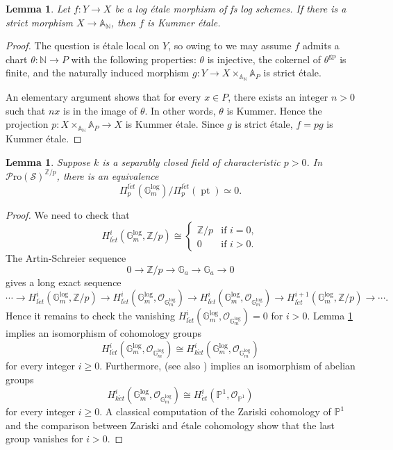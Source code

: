 \documentclass[11pt, a4paper]{amsart}
\newtheorem{lem}[thm]{Lemma}
\theoremstyle{definition}
\numberwithin{equation}{subsection}
\newcommand{\N}{\mathbb{N}}
\newcommand{\Z}{\mathbb{Z}}
\renewcommand{\P}{\mathbb{P}}
\newcommand{\A}{\mathbb{A}}
\newcommand{\pt}[1]{\mathrm{\pt}_{#1}}
\newcommand{\gp}{{\mathrm{gp}}}
\newcommand{\et}{{\acute{e}t}}
\newcommand{\ket}{{k\acute{e}t}}
\newcommand{\leta}{{l\acute{e}t}}
\newcommand{\cO}{\mathcal{O}}
\newcommand{\Gmm}{\mathbb{G}_m^{\mathrm{log}}}
\def\pt{\operatorname{pt}}
\newcommand{\infSpc}{\mathcal{S}}
\newcommand{\infPro}{\mathcal{P}\mathrm{ro}}
\begin{document}
\begin{lem}
\label{ketreal.16}
Let $f\colon Y\to X$ be a log \'etale morphism of fs log schemes.
If there is a strict morphism $X\to \A_\N$,
then $f$ is Kummer \'etale.
\end{lem}
\begin{proof}
The question is \'etale local on $Y$, 
so owing to \cite[Theorem IV.3.3.1]{Ogu} we may assume $f$ admits a chart $\theta\colon \N\to P$ 
with the following properties: 
$\theta$ is injective, 
the cokernel of $\theta^{\gp}$ is finite, 
and the naturally induced morphism $g\colon Y\to X\times_{\A_\N}\A_P$ is strict \'etale.

An elementary argument shows that for every $x\in P$, 
there exists an integer $n>0$ such that $nx$ is in the image of $\theta$.
In other words, $\theta$ is Kummer.
Hence the projection $p\colon X\times_{\A_\N}\A_P\to X$ is Kummer \'etale.
Since $g$ is strict \'etale, $f=pg$ is Kummer \'etale.
\end{proof}

\begin{lem}
\label{ketreal.14}
Suppose $k$ is a separably closed field of characteristic $p>0$.
In $\infPro(\infSpc)^{\Z/p}$, there is an equivalence
\[
\Pi_{p}^{\leta}(\Gmm)/\Pi_p^{\leta}(\pt)
\simeq
0.
\]
\end{lem}
\begin{proof}
We need to check that 
\[
H_{\leta}^i(\Gmm,\Z/p)
\cong
\left\{
\begin{array}{ll}
\Z/p & \text{if }i=0,
\\
0 & \text{if }i>0.
\end{array}
\right.
\]
The Artin-Schreier sequence
\[
0\to \Z/p\to \mathbb{G}_a\to \mathbb{G}_a\to 0
\]
gives a long exact sequence
\[
\cdots
\to
H_{\leta}^i(\Gmm,\Z/p)
\to
H_{\leta}^i(\Gmm,\cO_{\Gmm})
\to
H_{\leta}^i(\Gmm,\cO_{\Gmm})
\to
H_{\leta}^{i+1}(\Gmm,\Z/p)
\to
\cdots.
\]
Hence it remains to check the vanishing $H_{\leta}^i(\Gmm,\cO_{\Gmm})=0$ for $i>0$.
Lemma \ref{ketreal.16} implies an isomorphism of cohomology groups
\[
H_{\leta}^i(\Gmm,\cO_{\Gmm})
\cong
H_{\ket}^i(\Gmm,\cO_{\Gmm})
\]
for every integer $i\geq 0$.
Furthermore, 
\cite[Proposition 6.5]{KatoLog2} (see also \cite[Proposition 3.27]{MR2452875}) implies an 
isomorphism of abelian groups
\[
H_{\ket}^i(\Gmm,\cO_{\Gmm})
\cong
H_{\et}^i(\P^1,\cO_{\P^1})
\]
for every integer $i\geq 0$.
A classical computation of the Zariski cohomology of $\P^1$ and the comparison between Zariski 
and \'etale cohomology show that the last group vanishes for $i>0$.
\end{proof}
\end{document}
